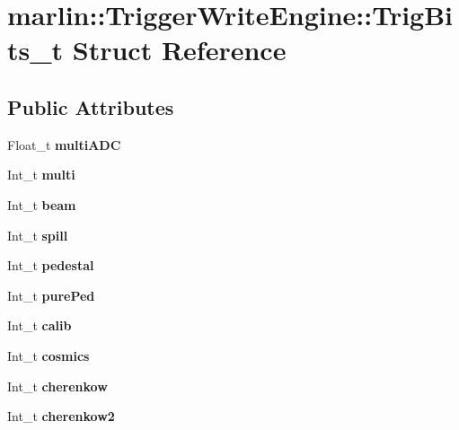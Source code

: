 \section{marlin\-:\-:Trigger\-Write\-Engine\-:\-:Trig\-Bits\-\_\-t Struct Reference}
\label{structmarlin_1_1TriggerWriteEngine_1_1TrigBits__t}
\subsection*{Public Attributes}
\begin{DoxyCompactItemize}
\item 
Float\-\_\-t {\bfseries multi\-A\-D\-C}\label{structmarlin_1_1TriggerWriteEngine_1_1TrigBits__t_a4347c637d9d5cc941041471aeb0a368e}

\item 
Int\-\_\-t {\bfseries multi}\label{structmarlin_1_1TriggerWriteEngine_1_1TrigBits__t_aa84cb0deeb8c10c636fed313dc58fc7c}

\item 
Int\-\_\-t {\bfseries beam}\label{structmarlin_1_1TriggerWriteEngine_1_1TrigBits__t_a5ded3e3e0ca7bfb761a88dd9b36aeb0a}

\item 
Int\-\_\-t {\bfseries spill}\label{structmarlin_1_1TriggerWriteEngine_1_1TrigBits__t_a62e76a5fe3479d877b475cb5cc1fe906}

\item 
Int\-\_\-t {\bfseries pedestal}\label{structmarlin_1_1TriggerWriteEngine_1_1TrigBits__t_ad14c6b3edf9c4b75db859cab8cb8ecd7}

\item 
Int\-\_\-t {\bfseries pure\-Ped}\label{structmarlin_1_1TriggerWriteEngine_1_1TrigBits__t_a8de61b16a5a2d6f32111538e30166613}

\item 
Int\-\_\-t {\bfseries calib}\label{structmarlin_1_1TriggerWriteEngine_1_1TrigBits__t_a788b761850c9fc571f7218ecbba6f981}

\item 
Int\-\_\-t {\bfseries cosmics}\label{structmarlin_1_1TriggerWriteEngine_1_1TrigBits__t_a712c3da6ae3684991337390b43702523}

\item 
Int\-\_\-t {\bfseries cherenkow}\label{structmarlin_1_1TriggerWriteEngine_1_1TrigBits__t_af23ef9b3f15c347bdc09f11c00b86a85}

\item 
Int\-\_\-t {\bfseries cherenkow2}\label{structmarlin_1_1TriggerWriteEngine_1_1TrigBits__t_a9df71622c51d7fe4795e174877877201}


\end{DoxyCompactItemize}
